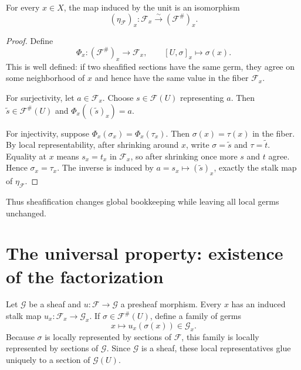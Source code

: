\begin{theorem}
For every $x\in X$, the map induced by the unit is an isomorphism
\[
(\eta_{\mathcal F})_x:\mathcal F_x\xrightarrow{\sim}(\mathcal F^\#)_x.
\]
\end{theorem}
\begin{proof}
Define
\[
\Phi_x:(\mathcal F^\#)_x\longrightarrow\mathcal F_x,
\qquad
[U,\sigma]_x\longmapsto\sigma(x).
\]
This is well defined: if two sheafified sections have the same germ, they agree on some
neighborhood of $x$ and hence have the same value in the fiber $\mathcal F_x$.

For surjectivity, let $a\in\mathcal F_x$.  Choose $s\in\mathcal F(U)$ representing $a$.
Then $\widetilde s\in\mathcal F^\#(U)$ and $\Phi_x((\widetilde s)_x)=a$.

For injectivity, suppose $\Phi_x(\sigma_x)=\Phi_x(\tau_x)$.  Then
$\sigma(x)=\tau(x)$ in the fiber.  By local representability, after shrinking around $x$,
write $\sigma=\widetilde s$ and $\tau=\widetilde t$.  Equality at $x$ means $s_x=t_x$ in
$\mathcal F_x$, so after shrinking once more $s$ and $t$ agree.  Hence $\sigma_x=\tau_x$.
The inverse is induced by $a=s_x\mapsto(\widetilde s)_x$, exactly the stalk map of
$\eta_{\mathcal F}$.
\end{proof}



Thus sheafification changes global bookkeeping while leaving all local germs unchanged.

\section{The universal property: existence of the factorization}

Let $\mathcal G$ be a sheaf and $u:\mathcal F\to\mathcal G$ a presheaf morphism.  Every
$x$ has an induced stalk map $u_x:\mathcal F_x\to\mathcal G_x$.  If
$\sigma\in\mathcal F^\#(U)$, define a family of germs
\[
x\longmapsto u_x(\sigma(x))\in\mathcal G_x.
\]
Because $\sigma$ is locally represented by sections of $\mathcal F$, this family is locally
represented by sections of $\mathcal G$.  Since $\mathcal G$ is a sheaf, these local
representatives glue uniquely to a section of $\mathcal G(U)$.

